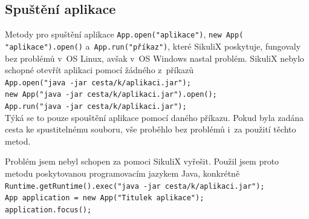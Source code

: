 		\subsection{Spuštění aplikace}
		Metody pro spuštění aplikace \texttt{App.open("aplikace")}, \texttt{new App(\\"aplikace").open()} a~\texttt{App.run("příkaz")}, které SikuliX poskytuje, fungovaly bez problémů v~OS Linux, avšak v~OS Windows nastal problém. SikuliX nebylo schopné otevřít aplikaci pomocí žádného z~příkazů\\[0.2cm]
		\texttt{App.open("java -jar cesta/k/aplikaci.jar");\\
		new App("java -jar cesta/k/aplikaci.jar").open();\\
		App.run("java -jar cesta/k/aplikaci.jar");}\\[0.2cm]
		Týká se to pouze spouštění aplikace pomocí daného příkazu. Pokud byla zadána cesta ke spustitelnému souboru, vše proběhlo bez problémů i~za použití těchto metod.
		
		Problém jsem nebyl schopen za pomoci SikuliX vyřešit. Použil jsem proto metodu poskytovanou programovacím jazykem Java, konkrétně\\[0.2cm]
		\texttt{Runtime.getRuntime().exec("java -jar cesta/k/aplikaci.jar");\\
		App application = new App("Titulek aplikace");\\
		application.focus();}
